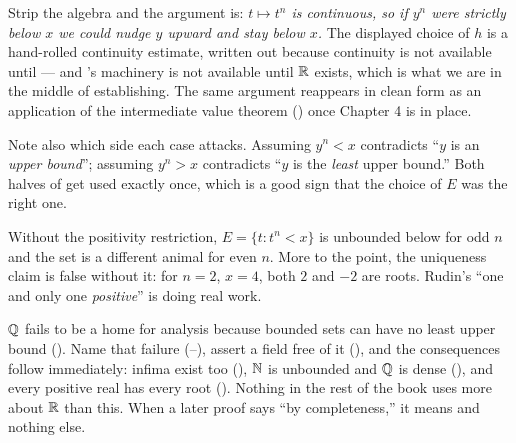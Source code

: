 \documentclass[11pt,twoside]{article}
\begin{document}
\begin{deeper}
Strip the algebra and the argument is: \emph{$t \mapsto t^n$ is continuous, so if
$y^n$ were strictly below $x$ we could nudge $y$ upward and stay below $x$.} The
displayed choice of $h$ is a hand-rolled continuity estimate, written out
because continuity is not available until  --- and 's
machinery is not available until $\mathbb{R}$ exists, which is what we are in the middle
of establishing. The same argument reappears in clean form as an application of
the intermediate value theorem () once Chapter 4 is in place.

Note also which side each case attacks. Assuming $y^n < x$ contradicts ``$y$ is
an \emph{upper bound}''; assuming $y^n > x$ contradicts ``$y$ is the
\emph{least} upper bound.'' Both halves of  get used exactly once,
which is a good sign that the choice of $E$ was the right one.
\end{deeper}

\begin{pitfall}
Without the positivity restriction, $E = \{t : t^n < x\}$ is unbounded below for
odd $n$ and the set is a different animal for even $n$. More to the point, the
uniqueness claim is false without it: for $n=2$, $x=4$, both $2$ and $-2$ are
roots. Rudin's ``one and only one \emph{positive}'' is doing real work.
\end{pitfall}

\vspace{6pt}
\begin{recap}
$\mathbb{Q}$ fails to be a home for analysis because bounded sets can have no least
upper bound (). Name that failure (--), assert a
field free of it (), and the consequences follow immediately: infima
exist too (), $\mathbb{N}$ is unbounded and $\mathbb{Q}$ is dense (), and
every positive real has every root (). Nothing in the rest of the
book uses more about $\mathbb{R}$ than this. When a later proof says ``by completeness,''
it means  and nothing else.
\end{recap}
\end{document}
